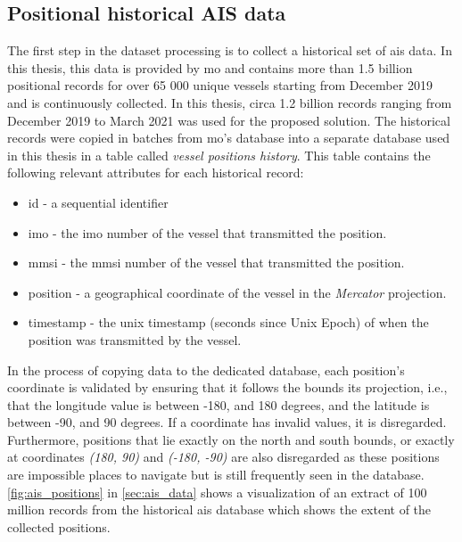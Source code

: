 \subsection{Positional historical AIS data}

The first step in the dataset processing is to collect a historical set of \acrshort{ais} data. In this thesis, this data is provided by \acrfull{mo} and contains more than 1.5 billion positional records for over 65 000 unique vessels starting from December 2019 and is continuously collected. In this thesis, circa 1.2 billion records ranging from December 2019 to March 2021 was used for the proposed solution. The historical records were copied in batches from \acrshort{mo}'s database into a separate database used in this thesis in a table called \textit{vessel positions history}. This table contains the following relevant attributes for each historical record:

\begin{itemize}
    \item id - a sequential identifier
    \item imo - the \acrshort{imo} number of the vessel that transmitted the position.
    \item mmsi - the \acrshort{mmsi} number of the vessel that transmitted the position.
    \item position - a geographical coordinate of the vessel in the \textit{Mercator} projection.
    \item timestamp - the unix timestamp (seconds since Unix Epoch) of when the position was transmitted by the vessel.
\end{itemize}

In the process of copying data to the dedicated database, each position's coordinate is validated by ensuring that it follows the bounds its projection, i.e., that the longitude value is between -180, and 180 degrees, and the latitude is between -90, and 90 degrees. If a coordinate has invalid values, it is disregarded. Furthermore, positions that lie exactly on the north and south bounds, or exactly at coordinates \textit{(180, 90)} and \textit{(-180, -90)} are also disregarded as these positions are impossible places to navigate but is still frequently seen in the database. \cref{fig:ais_positions} in \cref{sec:ais_data} shows a visualization of an extract of 100 million records from the historical \acrshort{ais} database which shows the extent of the collected positions.

